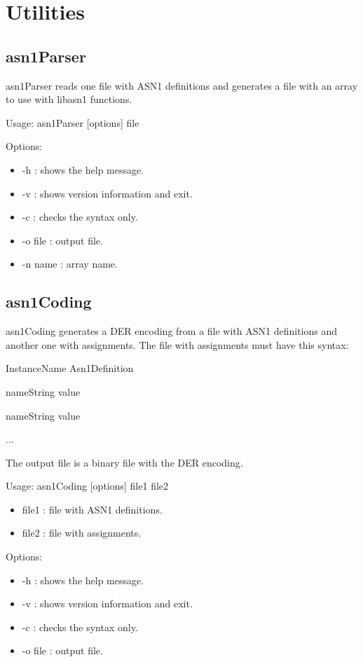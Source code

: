 \documentclass{book}
\begin{document}
\chapter{Utilities}

\section{asn1Parser}
asn1Parser reads one file with ASN1 definitions and generates a file 
with an array to use with libasn1 functions.
\par
Usage:  asn1Parser [options] file
\par
Options:
\begin{itemize}
\item -h : shows the help message.
\item -v : shows version information and exit.
\item -c : checks the syntax only.
\item -o file : output file.
\item -n name : array name.
\end{itemize}


\section{asn1Coding}
asn1Coding generates a DER encoding from a file with ASN1 definitions
and another one with assignments.
The file with assignments must have this syntax:
\par
InstanceName  Asn1Definition
\par
nameString  value
\par 
nameString  value
\par
...
\par
The output file is a binary file with the DER encoding.
\par
Usage:  asn1Coding [options] file1 file2
\begin{itemize}
\item file1 : file with ASN1 definitions.
\item file2 : file with assignments.
\end{itemize}

\par
Options:
\begin{itemize}
\item -h : shows the help message.
\item -v : shows version information and exit.
\item -c : checks the syntax only.
\item -o file : output file.
\end{itemize}
\end{document}
